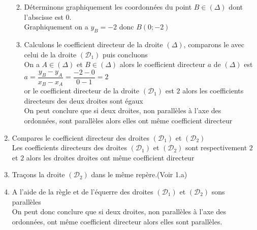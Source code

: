 \begin{multicols*}{2}
\begin{enumerate}
\begin{enumerate}
\begin{minipage}{8cm}
  			\end{minipage}
  			\item Déterminons graphiquement les coordonnées du point $ B \in (\Delta)  $ dont l'abscisse est 0. \\ 
  			Graphiquement on a $ y_B=-2 $ donc $ B(0;-2) $
  			\item Calculons le coefficient directeur de la droite $(\Delta) $, comparons le avec celui de la droite $ (\mathcal{D}_{1}) $ puis concluons\\
  			On a $ A\in (\Delta) $ et $ B\in (\Delta ) $ alors le coefficient directeur $ a $ de $ (\Delta) $ est $ a=  \dfrac{y_B-y_A}{x_B-x_A}=\dfrac{-2-0}{0-1}=2 $ \\ 
  			or le coefficient directeur de la droite $ (\mathcal{D}_{1}) $ est $ 2 $ alors les coefficients directeurs des deux droites sont égaux\\ 
  			On peut conclure que si deux droites, non parallèles à l'axe des ordonnées, sont parallèles alors elles ont   même coefficient directeur 
  		\end{enumerate}
  		\item  Compares le coefficient directeur des droites $ (\mathcal{D}_{1}) $ et $ (\mathcal{D}_{2}) $\\
  		Les coefficients directeurs des droites $ (\mathcal{D}_{1}) $ et $ (\mathcal{D}_{2}) $ sont respectivement $ 2 $ et $ 2 $ alors les droites droites ont même coefficient directeur 
  		\item Traçons la droite $ (\mathcal{D}_{2}) $ dans le même repère.(Voir 1.a)
  		\item A l'aide de la règle et de l'équerre    des droites $ (\mathcal{D}_{1}) $ et $ (\mathcal{D}_{2}) $  sons parallèles \\ On peut donc conclure que si deux droites, non parallèles à l'axe des ordonnées, ont même coefficient directeur alors elles sont parallèles.  

\end{enumerate}
\end{multicols*}
